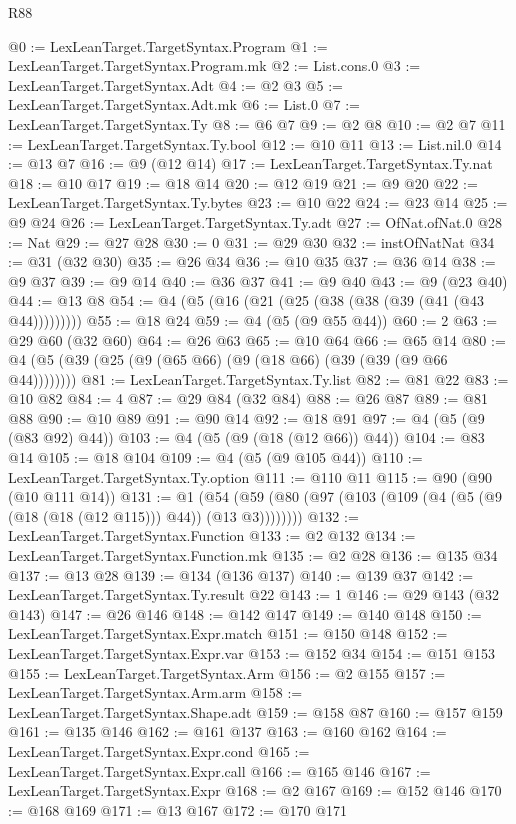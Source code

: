 \begin{lexlean}{R88}
\begin{coremodule}
@0 := LexLeanTarget.TargetSyntax.Program
@1 := LexLeanTarget.TargetSyntax.Program.mk
@2 := List.cons.{0}
@3 := LexLeanTarget.TargetSyntax.Adt
@4 := @2 @3
@5 := LexLeanTarget.TargetSyntax.Adt.mk
@6 := List.{0}
@7 := LexLeanTarget.TargetSyntax.Ty
@8 := @6 @7
@9 := @2 @8
@10 := @2 @7
@11 := LexLeanTarget.TargetSyntax.Ty.bool
@12 := @10 @11
@13 := List.nil.{0}
@14 := @13 @7
@16 := @9 (@12 @14)
@17 := LexLeanTarget.TargetSyntax.Ty.nat
@18 := @10 @17
@19 := @18 @14
@20 := @12 @19
@21 := @9 @20
@22 := LexLeanTarget.TargetSyntax.Ty.bytes
@23 := @10 @22
@24 := @23 @14
@25 := @9 @24
@26 := LexLeanTarget.TargetSyntax.Ty.adt
@27 := OfNat.ofNat.{0}
@28 := Nat
@29 := @27 @28
@30 := 0
@31 := @29 @30
@32 := instOfNatNat
@34 := @31 (@32 @30)
@35 := @26 @34
@36 := @10 @35
@37 := @36 @14
@38 := @9 @37
@39 := @9 @14
@40 := @36 @37
@41 := @9 @40
@43 := @9 (@23 @40)
@44 := @13 @8
@54 := @4 (@5 (@16 (@21 (@25 (@38 (@38 (@39 (@41 (@43 @44)))))))))
@55 := @18 @24
@59 := @4 (@5 (@9 @55 @44))
@60 := 2
@63 := @29 @60 (@32 @60)
@64 := @26 @63
@65 := @10 @64
@66 := @65 @14
@80 := @4 (@5 (@39 (@25 (@9 (@65 @66) (@9 (@18 @66) (@39 (@39 (@9 @66 @44))))))))
@81 := LexLeanTarget.TargetSyntax.Ty.list
@82 := @81 @22
@83 := @10 @82
@84 := 4
@87 := @29 @84 (@32 @84)
@88 := @26 @87
@89 := @81 @88
@90 := @10 @89
@91 := @90 @14
@92 := @18 @91
@97 := @4 (@5 (@9 (@83 @92) @44))
@103 := @4 (@5 (@9 (@18 (@12 @66)) @44))
@104 := @83 @14
@105 := @18 @104
@109 := @4 (@5 (@9 @105 @44))
@110 := LexLeanTarget.TargetSyntax.Ty.option
@111 := @110 @11
@115 := @90 (@90 (@10 @111 @14))
@131 := @1 (@54 (@59 (@80 (@97 (@103 (@109 (@4 (@5 (@9 (@18 (@18 (@12 @115))) @44)) (@13 @3))))))))
@132 := LexLeanTarget.TargetSyntax.Function
@133 := @2 @132
@134 := LexLeanTarget.TargetSyntax.Function.mk
@135 := @2 @28
@136 := @135 @34
@137 := @13 @28
@139 := @134 (@136 @137)
@140 := @139 @37
@142 := LexLeanTarget.TargetSyntax.Ty.result @22
@143 := 1
@146 := @29 @143 (@32 @143)
@147 := @26 @146
@148 := @142 @147
@149 := @140 @148
@150 := LexLeanTarget.TargetSyntax.Expr.match
@151 := @150 @148
@152 := LexLeanTarget.TargetSyntax.Expr.var
@153 := @152 @34
@154 := @151 @153
@155 := LexLeanTarget.TargetSyntax.Arm
@156 := @2 @155
@157 := LexLeanTarget.TargetSyntax.Arm.arm
@158 := LexLeanTarget.TargetSyntax.Shape.adt
@159 := @158 @87
@160 := @157 @159
@161 := @135 @146
@162 := @161 @137
@163 := @160 @162
@164 := LexLeanTarget.TargetSyntax.Expr.cond
@165 := LexLeanTarget.TargetSyntax.Expr.call
@166 := @165 @146
@167 := LexLeanTarget.TargetSyntax.Expr
@168 := @2 @167
@169 := @152 @146
@170 := @168 @169
@171 := @13 @167
@172 := @170 @171

\end{coremodule}
\end{lexlean}
